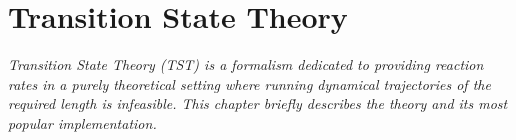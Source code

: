 \chapter{Transition State Theory}
\label{chap:tst}
\textit{Transition State Theory (TST) is a formalism dedicated to providing reaction rates in a purely theoretical setting where running dynamical trajectories of the required length is infeasible.
This chapter briefly describes the theory and its most popular implementation.}



